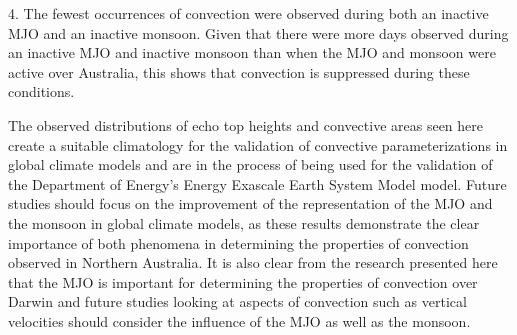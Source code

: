 \documentclass[journal abbreviation, manuscript]{copernicus}
\begin{document}
    4. The fewest occurrences of convection were observed during both an inactive MJO and an inactive monsoon. Given that there were more days observed during an inactive MJO and inactive monsoon than when the MJO and monsoon were active over Australia, this shows that convection is suppressed during these conditions.
    
    The observed distributions of echo top heights and convective areas seen here create a suitable climatology for the validation of convective parameterizations in global climate models and are in the process of being used for the validation of the Department of Energy's Energy Exascale Earth System Model model. Future studies should focus on the improvement of the representation of the MJO and the monsoon in global climate models, as these results demonstrate the clear importance of both phenomena in determining the properties of convection observed in Northern Australia. It is also clear from the research presented here that the MJO is important for determining the properties of convection over Darwin and future studies looking at aspects of convection such as vertical velocities should consider the influence of the MJO as well as the monsoon. 







\end{document}
